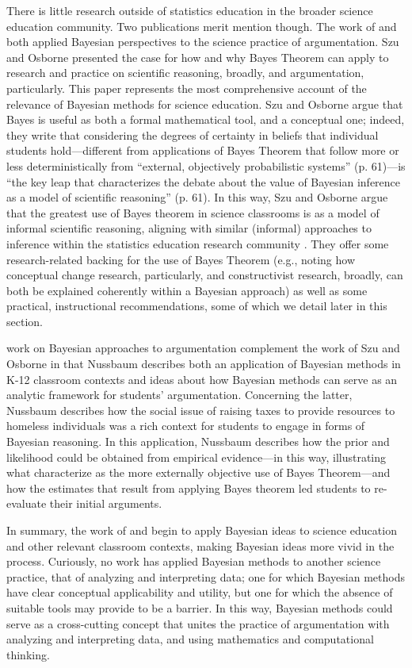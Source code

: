 \documentclass[man]{apa7}
\begin{document}
There is little research outside of statistics education in the broader science education community. Two publications merit mention though. The work of \textcite{so12} and \textcite{n11} both applied Bayesian perspectives to the science practice of argumentation. Szu and Osborne presented the case for how and why Bayes Theorem can apply to research and practice on scientific reasoning, broadly, and argumentation, particularly. This paper represents the most comprehensive account of the relevance of Bayesian methods for science education. Szu and Osborne argue that Bayes is useful as both a formal mathematical tool, and a conceptual one; indeed, they write that considering the degrees of certainty in beliefs that individual students hold—different from applications of Bayes Theorem that follow more or less deterministically from ``external, objectively probabilistic systems'' (p. 61)—is ``the key leap that characterizes the debate about the value of Bayesian inference as a model of scientific reasoning'' (p. 61). In this way, Szu and Osborne argue that the greatest use of Bayes theorem in science classrooms is as a model of informal scientific reasoning, aligning with similar (informal) approaches to inference within the statistics education research community \parencite{batanero2016research, mr18}. They offer some research-related backing for the use of Bayes Theorem (e.g., noting how conceptual change research, particularly, and constructivist research, broadly, can both be explained coherently within a Bayesian approach) as well as some practical, instructional recommendations, some of which we detail later in this section.

\textcite{n11} work on Bayesian approaches to argumentation complement the work of Szu and Osborne in that Nussbaum describes both an application of Bayesian methods in K-12 classroom contexts and ideas about how Bayesian methods can serve as an analytic framework for students’ argumentation. Concerning the latter, Nussbaum describes how the social issue of raising taxes to provide resources to homeless individuals was a rich context for students to engage in forms of Bayesian reasoning. In this application, Nussbaum describes how the prior and likelihood could be obtained from empirical evidence—in this way, illustrating what \textcite{so12} characterize as the more externally objective use of Bayes Theorem—and how the estimates that result from applying Bayes theorem led students to re-evaluate their initial arguments. 

In summary, the work of \textcite{so12} and \textcite{n11} begin to apply Bayesian ideas to science education and other relevant classroom contexts, making Bayesian ideas more vivid in the process. Curiously, no work has applied Bayesian methods to another science practice, that of analyzing and interpreting data; one for which Bayesian methods have clear conceptual applicability and utility, but one for which the absence of suitable tools may provide to be a barrier. In this way, Bayesian methods could serve as a cross-cutting concept \parencite{nrc12} that unites the practice of argumentation with analyzing and interpreting data, and using mathematics and computational thinking.
\end{document}
